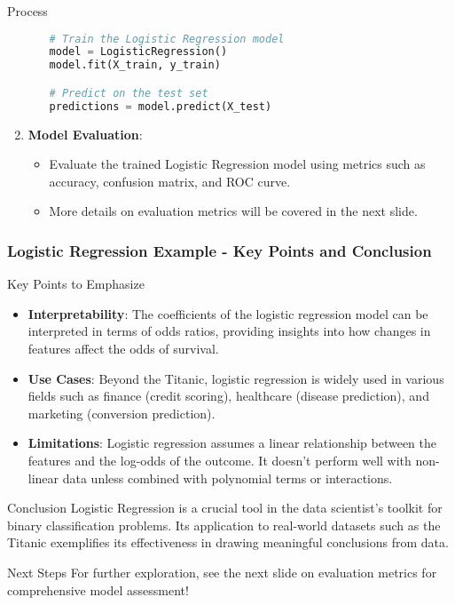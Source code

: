 \documentclass[aspectratio=169]{beamer}
\begin{document}
\begin{frame}[fragile]
\begin{block}{Process}
\begin{enumerate}
\begin{itemize}
\begin{lstlisting}[language=Python]
# Train the Logistic Regression model
model = LogisticRegression()
model.fit(X_train, y_train)

# Predict on the test set
predictions = model.predict(X_test)
                \end{lstlisting}
            \end{itemize}

            \item \textbf{Model Evaluation}:
            \begin{itemize}
                \item Evaluate the trained Logistic Regression model using metrics such as accuracy, confusion matrix, and ROC curve.
                \item More details on evaluation metrics will be covered in the next slide.
            \end{itemize}
        \end{enumerate}
    \end{block}
\end{frame}

\begin{frame}[fragile]
    \frametitle{Logistic Regression Example - Key Points and Conclusion}
    \begin{block}{Key Points to Emphasize}
        \begin{itemize}
            \item \textbf{Interpretability}: The coefficients of the logistic regression model can be interpreted in terms of odds ratios, providing insights into how changes in features affect the odds of survival.
            \item \textbf{Use Cases}: Beyond the Titanic, logistic regression is widely used in various fields such as finance (credit scoring), healthcare (disease prediction), and marketing (conversion prediction).
            \item \textbf{Limitations}: Logistic regression assumes a linear relationship between the features and the log-odds of the outcome. It doesn't perform well with non-linear data unless combined with polynomial terms or interactions.
        \end{itemize}
    \end{block}

    \begin{block}{Conclusion}
        Logistic Regression is a crucial tool in the data scientist's toolkit for binary classification problems. Its application to real-world datasets such as the Titanic exemplifies its effectiveness in drawing meaningful conclusions from data.
    \end{block}

    \begin{block}{Next Steps}
        For further exploration, see the next slide on evaluation metrics for comprehensive model assessment!
    \end{block}
\end{frame}
\end{document}
